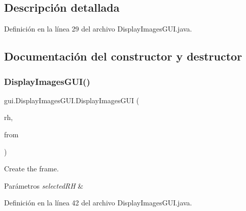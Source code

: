 \subsection{Descripción detallada}


Definición en la línea 29 del archivo Display\+Images\+G\+U\+I.\+java.



\subsection{Documentación del constructor y destructor}
\mbox{\label{classgui_1_1_display_images_g_u_i_aec52199fa3d22a15985d9b80ecc09934}} 
\subsubsection{\texorpdfstring{DisplayImagesGUI()}{DisplayImagesGUI()}}
{\footnotesize\ttfamily gui.\+Display\+Images\+G\+U\+I.\+Display\+Images\+G\+UI (\begin{DoxyParamCaption}\item[{\mbox{\hyperlink{classdomain_1_1_rural_house}{Rural\+House}}}]{rh,  }\item[{int}]{from }\end{DoxyParamCaption})}



Create the frame. 


\begin{DoxyParams}{Parámetros}
{\em selected\+RH} & \\
\hline
\end{DoxyParams}


Definición en la línea 42 del archivo Display\+Images\+G\+U\+I.\+java.



